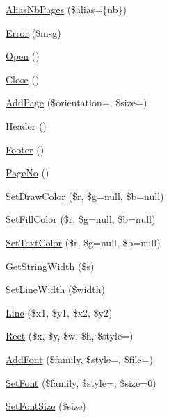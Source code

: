 \begin{DoxyCompactItemize}
\item 
\hyperlink{class_f_p_d_f_abaa0ba28883e13a200d33a0a765e5927}{Alias\+Nb\+Pages} (\$alias=\textquotesingle{}\{nb\}\textquotesingle{})
\item 
\hyperlink{class_f_p_d_f_a5afab85a7aaf19395f9a0e86cae76928}{Error} (\$msg)
\item 
\hyperlink{class_f_p_d_f_a108c38280cadce79d90a9a3cedcbfb80}{Open} ()
\item 
\hyperlink{class_f_p_d_f_a2fd4e06444aa4ace4cab6d6950ba2bb2}{Close} ()
\item 
\hyperlink{class_f_p_d_f_a76ce42e38224e33f30113593ed1d718b}{Add\+Page} (\$orientation=\textquotesingle{}\textquotesingle{}, \$size=\textquotesingle{}\textquotesingle{})
\item 
\hyperlink{class_f_p_d_f_af476ba4a046025587e6ca04f98918434}{Header} ()
\item 
\hyperlink{class_f_p_d_f_a2f39533ba0786237090683635ef01c49}{Footer} ()
\item 
\hyperlink{class_f_p_d_f_a95cd8334f0957fa50b42d5591d988dbc}{Page\+No} ()
\item 
\hyperlink{class_f_p_d_f_a30dc6a03020966564d6aaeed51809250}{Set\+Draw\+Color} (\$r, \$g=null, \$b=null)
\item 
\hyperlink{class_f_p_d_f_ad8a03e2c2dfc303bd3b8fddae75995a8}{Set\+Fill\+Color} (\$r, \$g=null, \$b=null)
\item 
\hyperlink{class_f_p_d_f_ae76e9d2786a48fad1ccce6a6bf83e4bc}{Set\+Text\+Color} (\$r, \$g=null, \$b=null)
\item 
\hyperlink{class_f_p_d_f_a917770b3091e6b6ec88b0a01d987ae5d}{Get\+String\+Width} (\$s)
\item 
\hyperlink{class_f_p_d_f_a8d1b4277d1df51284db9de92377c5cf0}{Set\+Line\+Width} (\$width)
\item 
\hyperlink{class_f_p_d_f_aa3dc679d089b2a0d559ec4ea72655ce3}{Line} (\$x1, \$y1, \$x2, \$y2)
\item 
\hyperlink{class_f_p_d_f_a1d505dc20dd926ac33cd0aba6d33e300}{Rect} (\$x, \$y, \$w, \$h, \$style=\textquotesingle{}\textquotesingle{})
\item 
\hyperlink{class_f_p_d_f_a36ad2e708366944522515bab35ca9aea}{Add\+Font} (\$family, \$style=\textquotesingle{}\textquotesingle{}, \$file=\textquotesingle{}\textquotesingle{})
\item 
\hyperlink{class_f_p_d_f_a40df6e672c4bdeec1d3fba17c53ca969}{Set\+Font} (\$family, \$style=\textquotesingle{}\textquotesingle{}, \$size=0)
\item 
\hyperlink{class_f_p_d_f_a1bda00d05f6aff93e9ec63e1d3ee89d9}{Set\+Font\+Size} (\$size)

\end{DoxyCompactItemize}
